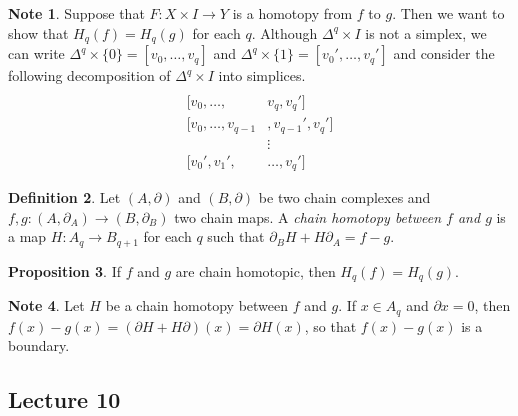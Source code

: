 \documentclass[10pt,letterpaper,cm]{nupset}
\theoremstyle{definition}
\newtheorem{definition}{Definition}[subsection]
\newtheorem{note}[definition]{Note}
\theoremstyle{theorem}
\newtheorem{prop}[definition]{Proposition}
\theoremstyle{remark}
\newcommand{\1}{\mathbb{1}}
\newcommand{\0}{\vec 0}
\begin{document}
\begin{note}
Suppose that $F : X \times I \to Y$ is a homotopy from $f$ to $g$. Then we want to show that $H_q(f) =H_q(g)$ for each $q$. Although $\Delta^q \times I $ is not a simplex, we can write $\Delta^q \times \{0\} = [v_0, \ldots, v_q]$ and $\Delta^q \times  \{1\} = [v_0', \ldots, v_q']$ and consider the following decomposition of  $\Delta^q \times I$ into simplices. 
\begin{align*}
[v_0, v_1, & \ldots, v_q]
\\ [v_0, \ldots, & v_q, v_q']
\\ [v_0, \ldots,  v_{q-1}&  , v_{q-1}', v_q']
\\ & \vdots
\\ [v_0', v_1', & \ldots, v_q']
\end{align*}
\end{note}

\begin{definition}
Let $(A, \partial)$ and $(B, \partial)$ be two chain complexes and $f,g : (A, \partial_A) \to (B, \partial_B)$ two chain maps. A \textit{chain homotopy between $f$ and $g$} is a map $H: A_q \to B_{q+1}$ for each $q$ such that $\partial_B H + H\partial_A = f-g$.
\end{definition}

\begin{prop}
If $f$ and $g$ are chain homotopic, then $H_q(f) = H_q(g)$. 
\end{prop}

\begin{note}
Let $H$ be a chain homotopy between $f$ and $g$. If $x\in A_q$ and $\partial{x} = 0$, then $f(x) -g(x) = (\partial H + H \partial)(x) = \partial H(x)$, so that $f(x) -g(x)$ is a boundary. 
\end{note}


\subsection{Lecture 10}
\end{document}
